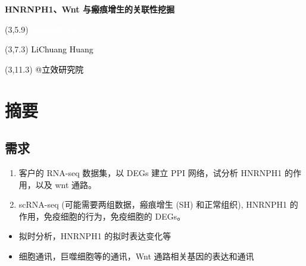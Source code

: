 \documentclass[
]{article}
\author{}
\date{\vspace{-2.5em}}
\providecommand{\tightlist}{%
  \setlength{\itemsep}{0pt}\setlength{\parskip}{0pt}}
\begin{document}
\begin{titlepage} 
\begin{center} \textbf{\Huge HNRNPH1、Wnt
与瘢痕增生的关联性挖掘} \vspace{4em}
\begin{textblock}{10}(3,5.9) \huge
\textbf{\textcolor{white}{2024-05-13}}
\end{textblock} \begin{textblock}{10}(3,7.3)
\Large \textcolor{black}{LiChuang Huang}
\end{textblock} \begin{textblock}{10}(3,11.3)
\Large \textcolor{black}{@立效研究院}
\end{textblock} \end{center} \end{titlepage}
\restoregeometry


\tableofcontents

\listoffigures

\listoftables

\newpage


\hypertarget{abstract}{%
\section{摘要}\label{abstract}}

\hypertarget{ux9700ux6c42}{%
\subsection{需求}\label{ux9700ux6c42}}

\begin{enumerate}
\def\labelenumi{\arabic{enumi}.}
\tightlist
\item
  客户的 RNA-seq 数据集，以 DEGs 建立 PPI 网络，试分析 HNRNPH1 的作用，以及 wnt 通路。
\item
  scRNA-seq (可能需要两组数据，瘢痕增生 (SH) 和正常组织), HNRNPH1 的作用，免疫细胞的行为，免疫细胞的 DEGs。
\end{enumerate}

\begin{itemize}
\tightlist
\item
  拟时分析，HNRNPH1 的拟时表达变化等
\item
  细胞通讯，巨噬细胞等的通讯，Wnt 通路相关基因的表达和通讯
\end{itemize}
\end{document}
